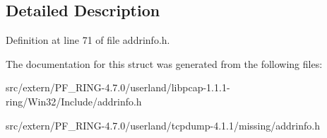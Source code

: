 \subsection{Detailed Description}


Definition at line 71 of file addrinfo.h.



The documentation for this struct was generated from the following files:\begin{DoxyCompactItemize}
\item 
src/extern/PF\_\-RING-\/4.7.0/userland/libpcap-\/1.1.1-\/ring/Win32/Include/addrinfo.h\item 
src/extern/PF\_\-RING-\/4.7.0/userland/tcpdump-\/4.1.1/missing/addrinfo.h\end{DoxyCompactItemize}
